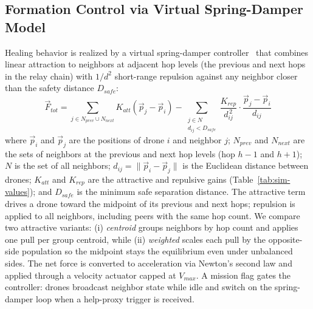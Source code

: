 \documentclass[conference]{IEEEtran}
\begin{document}
\subsection{Formation Control via Virtual Spring-Damper Model}
Healing behavior is realized by a virtual spring-damper
controller~\cite{piemngam2019virtual, chen2015virtual} that combines
linear attraction to neighbors at adjacent hop levels (the previous and
next hops in the relay chain) with $1/d^2$ short-range repulsion against any
neighbor closer than the safety distance $D_{safe}$:
\begin{equation}
    \vec{F}_{tot} = \!\!\!\sum_{j \in N_{prev}\cup N_{next}}\!\!\! K_{att}(\vec{p}_j-\vec{p}_i) - \!\!\!\sum_{\substack{j \in N \\ d_{ij} < D_{safe}}}\!\!\! \frac{K_{rep}}{d_{ij}^{\,2}}\cdot\frac{\vec{p}_j-\vec{p}_i}{d_{ij}}
\end{equation}
where $\vec{p}_i$ and $\vec{p}_j$ are the positions of drone $i$ and neighbor $j$; 
$N_{prev}$ and $N_{next}$ are the sets of neighbors at the previous 
and next hop levels (hop $h-1$ and $h+1$); $N$ is the set of all neighbors; 
$d_{ij} = \lVert\vec{p}_i - \vec{p}_j\rVert$ is the Euclidean distance between 
drones; $K_{att}$ and $K_{rep}$ are the attractive and repulsive gains 
(Table~\ref{tab:sim-values}); and $D_{safe}$ is the minimum safe separation distance.
The attractive term drives a drone toward the midpoint of its previous and next 
hops; repulsion is applied to all neighbors, including peers with the same hop count. 
We compare two attractive variants: (i) \textit{centroid} groups neighbors by hop count and
applies one pull per group centroid, while (ii) \textit{weighted} scales each pull
by the opposite-side population so the midpoint stays the equilibrium even
under unbalanced sides. The net force is converted to acceleration via
Newton's second law and applied through a velocity actuator capped at
$V_{max}$. A mission flag gates the controller: drones broadcast neighbor
state while idle and switch on the spring-damper loop when a help-proxy
trigger is received.
\end{document}
